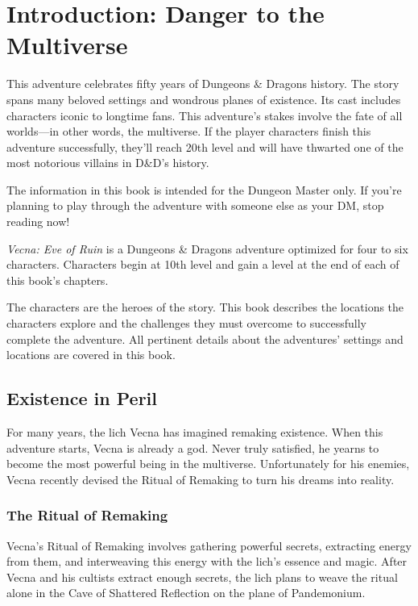 \documentclass[10pt,a4paper,twoside,bg=print,twocolumn,openany,nodeprecatedcode]{dndbook}
\date{}
\begin{document}
\frontmatter
\tableofcontents
\mainmatter
{}
\chapter*{Introduction: Danger to the Multiverse}
This adventure celebrates fifty years of Dungeons \& Dragons history. The story spans many beloved settings and wondrous planes of existence. Its cast includes characters iconic to longtime fans. This adventure's stakes involve the fate of all worlds—in other words, the multiverse. If the player characters finish this adventure successfully, they'll reach 20th level and will have thwarted one of the most notorious villains in D\&D's history.

The information in this book is intended for the Dungeon Master only. If you're planning to play through the adventure with someone else as your DM, stop reading now!

\textit{Vecna: Eve of Ruin} is a Dungeons \& Dragons adventure optimized for four to six characters. Characters begin at 10th level and gain a level at the end of each of this book's chapters.

The characters are the heroes of the story. This book describes the locations the characters explore and the challenges they must overcome to successfully complete the adventure. All pertinent details about the adventures' settings and locations are covered in this book.

\section{Existence in Peril}
For many years, the lich Vecna has imagined remaking existence. When this adventure starts, Vecna is already a god. Never truly satisfied, he yearns to become the most powerful being in the multiverse. Unfortunately for his enemies, Vecna recently devised the Ritual of Remaking to turn his dreams into reality.

\subsection{The Ritual of Remaking}
Vecna's Ritual of Remaking involves gathering powerful secrets, extracting energy from them, and interweaving this energy with the lich's essence and magic. After Vecna and his cultists extract enough secrets, the lich plans to weave the ritual alone in the Cave of Shattered Reflection on the plane of Pandemonium.
\end{document}
